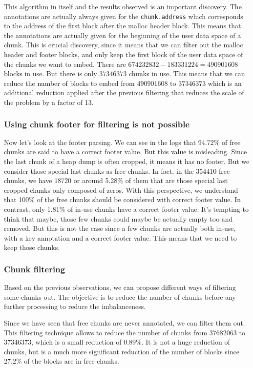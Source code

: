    This algorithm in itself and the results observed is an important discovery. The annotations are actually always given for the \texttt{chunk.address} which corresponds to the address of the first block after the malloc header block. This means that the annotations are actually given for the beginning of the user data space of a chunk. This is crucial discovery, since it means that we can filter out the malloc header and footer blocks, and only keep the first block of the user data space of the chunks we want to embed. There are $674232832 - 183331224 = 490901608$ blocks in use. But there is only $37346373$ chunks in use. This means that we can reduce the number of blocks to embed from $490901608$ to $37346373$ which is an additional reduction applied after the previous filtering that reduces the scale of the problem by a factor of 13. 

    \subsubsection{Using chunk footer for filtering is not possible}
    
    Now let's look at the footer parsing. We can see in the logs that 94.72\% of free chunks are said to have a correct footer value. But this value is misleading. Since the last chunk of a heap dump is often cropped, it means it has no footer. But we consider those special last chunks as free chunks. In fact, in the $354410$ free chunks, we have $18720$ or around 5.28\% of them that are those special last cropped chunks only composed of zeros. With this perspective, we understand that 100\% of the free chunks should be considered with correct footer value. In contrast, only 1.81\% of in-use chunks have a correct footer value. It's tempting to think that maybe, those few chunks could maybe be actually empty too and removed. But this is not the case since a few chunks are actually both in-use, with a key annotation and a correct footer value. This means that we need to keep those chunks.

    \subsubsection{Chunk filtering}
    Based on the previous observations, we can propose different ways of filtering some chunks out. The objective is to reduce the number of chunks before any further processing to reduce the imbalanceness.

    Since we have seen that free chunks are never annotated, we can filter them out. This filtering technique allows to reduce the number of chunks from $37682063$ to $37346373$, which is a small reduction of 0.89\%. It is not a huge reduction of chunks, but is a much more significant reduction of the number of blocks since 27.2\% of the blocks are in free chunks.

